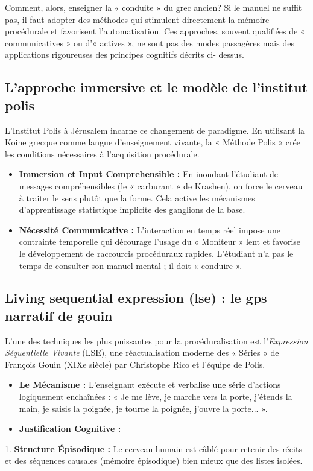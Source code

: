 Comment, alors, enseigner la « conduite » du grec ancien? Si le manuel ne suffit pas, il faut
adopter des méthodes qui stimulent directement la mémoire procédurale et favorisent
l'automatisation. Ces approches, souvent qualifiées de « communicatives » ou d'« actives », ne sont
pas des modes passagères mais des applications rigoureuses des principes cognitifs décrits ci-
dessus.



\subsection{L'approche immersive et le modèle de l'institut polis}

L'Institut Polis à Jérusalem incarne ce changement de paradigme. En utilisant la Koine grecque comme
langue d'enseignement vivante, la « Méthode Polis » crée les conditions nécessaires à l'acquisition
procédurale.\cite{III-3-3-ref47}

\begin{itemize}\item \textbf{Immersion et Input Comprehensible :} En inondant l'étudiant de messages compréhensibles (le « carburant » de Krashen), on force le cerveau à traiter le sens plutôt que la forme. Cela active les mécanismes d'apprentissage statistique implicite des ganglions de la base.\cite{III-3-3-ref49}\item \textbf{Nécessité Communicative :} L'interaction en temps réel impose une contrainte temporelle qui décourage l'usage du « Moniteur » lent et favorise le développement de raccourcis procéduraux rapides. L'étudiant n'a pas le temps de consulter son manuel mental ; il doit « conduire ».\cite{III-3-3-ref51}\end{itemize}

\subsection{Living sequential expression (lse) : le gps narratif de gouin}

L'une des techniques les plus puissantes pour la procéduralisation est l'\textit{Expression
Séquentielle Vivante} (LSE), une réactualisation moderne des « Séries » de François Gouin (XIXe
siècle) par Christophe Rico et l'équipe de Polis.\cite{III-3-3-ref48}

\begin{itemize}\item \textbf{Le Mécanisme :} L'enseignant exécute et verbalise une série d'actions logiquement enchaînées : « Je me lève, je marche vers la porte, j'étends la main, je saisis la poignée, je tourne la poignée, j'ouvre la porte... ».\cite{III-3-3-ref54}\item \textbf{Justification Cognitive :}\end{itemize}1. \textbf{Structure Épisodique :} Le cerveau humain est câblé pour retenir des récits et des
séquences causales (mémoire épisodique) bien mieux que des listes isolées.\cite{III-3-3-ref48}

